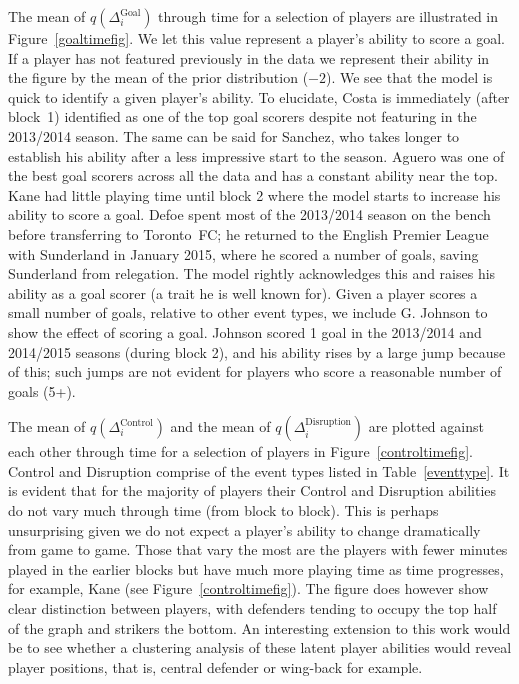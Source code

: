 \documentclass[11pt,a4paper]{article}
\begin{document}
The mean of $q(\Delta_i^{\textrm{Goal}})$ through time for 
a selection of players are illustrated in Figure~\ref{goaltimefig}. We 
let this value represent a player's ability to score a goal. If a player 
has not featured previously in the data we represent their ability in the 
figure by the mean of the prior distribution ($-2$). We see that the model is 
quick to identify a given player's ability. To elucidate, Costa is 
immediately (after block~1) identified as one of the top goal scorers 
despite not featuring in the 2013/2014 season. The same can be said for 
Sanchez, who takes longer to establish his ability after a less 
impressive start to the season. Aguero was one of the best goal scorers 
across all the data and has a constant ability near the top. Kane had 
little playing time until block 2 where the model starts to increase 
his ability to score a goal. Defoe spent most of the 2013/2014 season 
on the bench before transferring to Toronto~FC; he returned to the 
English Premier League with Sunderland in January 2015, where he scored 
a number of goals, saving Sunderland from relegation. The model rightly 
acknowledges this and raises his ability as a goal scorer (a trait he 
is well known for). Given a player scores a small number of goals, 
relative to other event types, we include G. Johnson to show the effect 
of scoring a goal. Johnson scored 1 goal in the 2013/2014 and 2014/2015 
seasons (during block 2), and his ability rises by a large jump because 
of this; such jumps are not evident for players who score a reasonable 
number of goals (5+).



The mean of $q(\Delta_i^{\textrm{Control}})$ and the mean 
of $q(\Delta_i^{\textrm{Disruption}})$ are plotted against 
each other through time for a selection of players in 
Figure~\ref{controltimefig}. Control and Disruption comprise of the 
event types listed in Table~\ref{eventtype}. It is evident that for 
the majority of players their Control and Disruption abilities do not 
vary much through time (from block to block). This is perhaps 
unsurprising given we do not expect a player's ability to change 
dramatically from game to game. Those that vary the most are the 
players with fewer minutes played in the earlier blocks but have much 
more playing time as time progresses, for example, Kane (see 
Figure~\ref{controltimefig}). The figure does however show clear 
distinction between players, with defenders tending to occupy the top 
half of the graph and strikers the bottom. An interesting 
extension to this work would be to see whether a clustering analysis 
of these latent player abilities would reveal player positions, that is, 
central defender or wing-back for example.  
\end{document}
